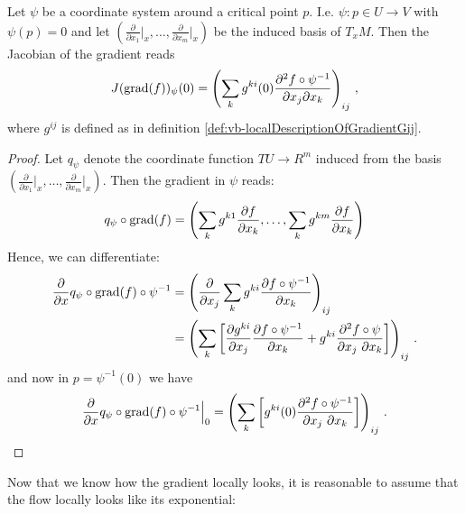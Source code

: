 \begin{lemma}\label{lem:morse-jabobianOfTheGradient}
	Let $\psi$ be a coordinate system around a critical point $p$. I.e. $\psi: p\in U\to V$ with $\psi(p)=0$ and let $\left( \frac{\partial}{\partial x_1}\big|_x,\dots ,\frac{\partial}{\partial x_m}\big|_x\right)$ be the induced basis of $T_xM$. Then the Jacobian of the gradient reads
	\begin{equation}
		J(\mathrm{grad}(f))_\psi(0)= \left(\sum_{k}g^{ki}(0)\frac{\partial ^2 f\circ \psi^{-1} }{\partial x_j \partial x_k} \right)_{ij}\, ,
	\end{equation}where $g^{ij}$ is defined as in definition \ref{def:vb-localDescriptionOfGradientGij}.
\end{lemma}
\begin{proof}
	Let $q_{\psi}$ denote the coordinate function $TU\to R^m$ induced from the basis $\left( \frac{\partial}{\partial x_1}\big|_x,\dots ,\frac{\partial}{\partial x_m}\big|_x\right)$. Then the gradient in $\psi$ reads:
	\begin{align*}
		q_{\psi}\circ \mathrm{grad}(f)=\left(\sum_kg^{k1  }\frac{\partial f	}{\partial x_k},\dots, \sum_kg^{k m }\frac{\partial f	}{\partial x_k}\right)
	\end{align*}
	Hence, we can differentiate: 
	\begin{align*}
		\frac{\partial}{\partial x}  q_{\psi}\circ \mathrm{grad}(f)\circ \psi^{-1}
		&= \left(\frac{\partial}{\partial x_j} \sum_k g^{ki}\frac{\partial f \circ \psi^{-1}}{\partial x_k}\right)_{ij} \\
		&= \left(\sum_k \left[ 
		\frac{\partial g^{ki}}{\partial x_j}\frac{\partial f \circ \psi^{-1}}{\partial x_k} +  g^{ki}\frac{\partial^2 f \circ \psi}{\partial x_j ~\partial x_k}
		\right]\right)_{ij} \, .
	\end{align*}
	and now in $p=\psi^{-1}(0)$ we have
	\begin{align*}
		\frac{\partial}{\partial x}  q_{\psi}\circ \mathrm{grad}(f)\circ \psi^{-1} \Big|_{0}=\left(\sum_k \left[ 
		g^{ki}(0)\frac{\partial^2 f \circ \psi^{-1}}{\partial x_j ~\partial x_k}
		\right]\right)_{ij} \, .
	\end{align*}
\end{proof} Now that we know how the gradient locally looks, it is reasonable to assume that the flow locally looks like its exponential:

